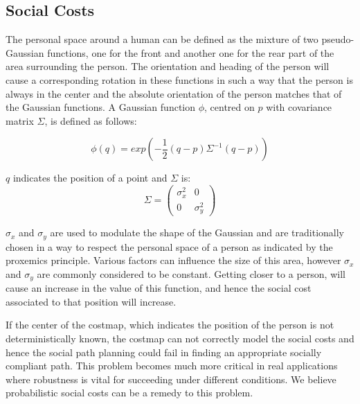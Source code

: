 
\subsection{Social Costs}


The personal space around a human can be defined as the mixture of two pseudo-Gaussian functions, one for the front and another one for the rear part of the area surrounding the person. The orientation and heading of the person will cause a corresponding rotation in these functions in such a way that the person is always in the center and the absolute orientation of the person matches that of the Gaussian functions. 
A Gaussian function $\phi$, centred on $p$ with covariance matrix $\Sigma$, is defined as follows:

\begin{equation}
\phi(q) = exp(-\frac{1}{2}(q-p)\Sigma^{-1}(q-p))
\end{equation}

$q$ indicates the position of a point and $\Sigma$ is:
\begin{equation}
\Sigma = \begin{pmatrix}
{\sigma}_{x}^2  & 0\\ 
 0& {\sigma}_{y}^2 
\end{pmatrix}
\end{equation}

${\sigma}_{x}$ and ${\sigma}_{y}$ are used to modulate the shape of the Gaussian and are traditionally chosen in a way to respect the personal space of a person as indicated by the proxemics principle. Various factors can influence the size of this area, however ${\sigma}_{x}$ and ${\sigma}_{y}$ are commonly considered to be constant. Getting closer to a person, will cause an increase in the value of this function, and hence the social cost associated to that position will increase.

If the center of the costmap, which indicates the position of the person is not deterministically known, the costmap can not correctly model the social costs and hence the social path planning could fail in finding an appropriate socially compliant path. This problem becomes much more critical in real applications where robustness is vital for succeeding under different conditions. We believe probabilistic social costs can be a remedy to this problem. 


